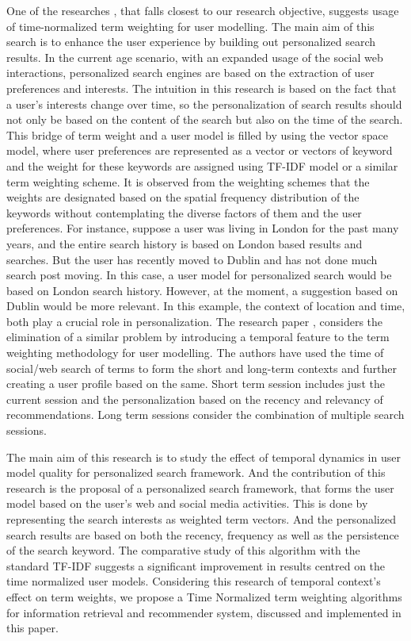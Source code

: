 	
	One of the researches \cite{RN27}, that falls closest to our research objective, suggests usage of time-normalized term weighting for user modelling. The main aim of this search is to enhance the user experience by building out personalized search results. In the current age scenario, with an expanded usage of the social web interactions, personalized search engines are based on the extraction of user preferences and interests. The intuition in this research is based on the fact that a user's interests change over time, so the personalization of search results should not only be based on the content of the search but also on the time of the search. This bridge of term weight and a user model is filled by using the vector space model, where user preferences are represented as a vector or vectors of keyword and the weight for these keywords are assigned using TF-IDF model or a similar term weighting scheme. It is observed from the weighting schemes that the weights are designated based on the spatial frequency distribution of the keywords without contemplating the diverse factors of them and the user preferences. For instance, suppose a user was living in London for the past many years, and the entire search history is based on London based results and searches. But the user has recently moved to Dublin and has not done much search post moving. In this case, a user model for personalized search would be based on London search history. However, at the moment, a suggestion based on Dublin would be more relevant. In this example, the context of location and time, both play a crucial role in personalization. The research paper \cite{RN27}, considers the elimination of a similar problem by introducing a temporal feature to the term weighting methodology for user modelling. The authors have used the time of social/web search of terms to form the short and long-term contexts and further creating a user profile based on the same. Short term session includes just the current session and the personalization based on the recency and relevancy of recommendations. Long term sessions consider the combination of multiple search sessions.
	
	The main aim of this research is to study the effect of temporal dynamics in user model quality for personalized search framework. And the contribution of this research is the proposal of a personalized search framework, that forms the user model based on the user's web and social media activities. This is done by representing the search interests as weighted term vectors. And the personalized search results are based on both the recency, frequency as well as the persistence of the search keyword.  The comparative study of this algorithm with the standard TF-IDF suggests a significant improvement in results centred on the time normalized user models. Considering this research of temporal context’s effect on term weights, we propose a Time Normalized term weighting algorithms for information retrieval and recommender system, discussed and implemented in this paper.